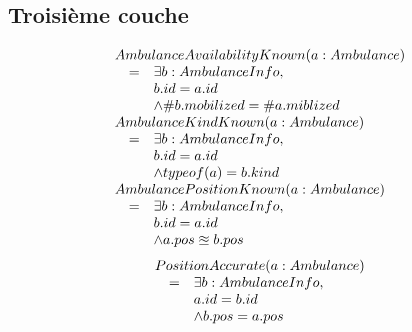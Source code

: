 \subsection{Troisième couche}
\begin{equation*}
\begin{array}{rcl}
\multicolumn{3}{l}{AmbulanceAvailabilityKnown(a: Ambulance)} \\
& = & \exists b: AmbulanceInfo, \\
&   & b.id = a.id \\
&   & \wedge \#b.mobilized = \#a.miblized \\

\multicolumn{3}{l}{AmbulanceKindKnown(a: Ambulance)} \\
& = & \exists b: AmbulanceInfo, \\
&   & b.id = a.id \\
&   & \wedge typeof(a) = b.kind \\

\multicolumn{3}{l}{AmbulancePositionKnown(a:Ambulance)} \\ 
& = & \exists b:AmbulanceInfo, \\
&   & b.id = a.id \\
&   & \wedge a.pos \approxeq b.pos \\
\end{array}
\end{equation*}
\begin{equation*}
\begin{array}{rcl}
\multicolumn{3}{l}{PositionAccurate(a:Ambulance)} \\ 
& = & \exists b:AmbulanceInfo, \\
&   & a.id = b.id \\
&   & \wedge b.pos = a.pos \\
\end{array}
\end{equation*}


